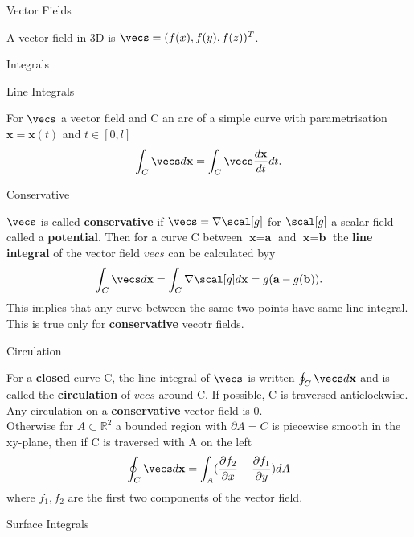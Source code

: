 \documentclass[12pt, letterpaper]{article}
\newcommand{\x}{\textbf{x}}
\newcommand{\R}{\mathbb{R}}
\newcommand{\pder}[2]{\frac{\partial{} #1}{\partial{} #2}}
\newcommand{\der}[2]{\frac{d #1}{d #2}}
\begin{document}
\begin{section}{Vector Fields}

  A vector field in 3D is \(\vecs = (f(x), f(y), f(z)){}^{T}\).

  \begin{subsection}{Integrals}

    \begin{subsubsection}{Line Integrals}

      For \(\vecs\) a vector field and C an arc of a simple curve with
      parametrisation \(\x = \x(t)\) and \(t \in [0, l]\)
      \[\int_{C} \vecs d \x = \int_{C} \vecs \der{\x}{t} dt.\]

    \end{subsubsection}

    \begin{subsubsection}{Conservative}

      \(\vecs\) is called \textbf{conservative} if \(\vecs = \nabla \scal[g]\)
      for \(\scal[g]\) a scalar field called a \textbf{potential}. Then for a
      curve C between \(\x = \textbf{a}\) and \(\x = \textbf{b}\) the
      \textbf{line integral} of the vector field \(vecs\) can be calculated byy
      \[\int_{C} \vecs d \x = \int_{C} \nabla \scal[g] d \x = g(\textbf{a} -
        g(\textbf{b})).\]
      This implies that any curve between the same two points have same line
      integral. This is true only for \textbf{conservative} vecotr fields.

    \end{subsubsection}

    \begin{subsubsection}{Circulation}

      For a \textbf{closed} curve C, the line integral of \(\vecs\) is written
      \(\oint_{C} \vecs d \x\) and is called the \textbf{circulation} of
      \(vecs\) around C. If possible, C is traversed anticlockwise. Any
      circulation on a \textbf{conservative} vector field is 0. \\
      Otherwise for \(A \subset \R^{2}\) a bounded region with \(\partial A =
      C\) is piecewise smooth in the xy-plane, then if C is traversed with A on
      the left
      \[\oint_{C} \vecs d \x = \int_{A} (\pder{f_{2}}{x} - \pder{f_{1}}{y})
        dA\]
      where \(f_{1}, f_{2}\) are the first two components of the vector field.


    \end{subsubsection}

    \begin{subsubsection}{Surface Integrals}


\end{subsubsection}
\end{subsection}
\end{section}
\end{document}
